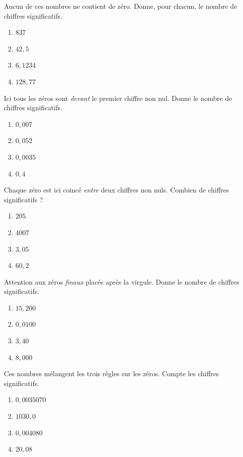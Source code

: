 \documentclass[11pt,a4paper]{article}
\begin{document}
\begin{exo}
Aucun de ces nombres ne contient de zéro. Donne, pour chacun, le nombre de chiffres significatifs.
\begin{enumerate}[label=\alph*)]
  \item $837$
  \item $42,5$
  \item $6,1234$
  \item $128,77$
\end{enumerate}
\end{exo}

\begin{exo}
Ici tous les zéros sont \emph{devant} le premier chiffre non nul. Donne le nombre de chiffres
significatifs.
\begin{enumerate}[label=\alph*)]
  \item $0,007$
  \item $0,052$
  \item $0,0035$
  \item $0,4$
\end{enumerate}
\end{exo}

\begin{exo}
Chaque zéro est ici coincé \emph{entre} deux chiffres non nuls. Combien de chiffres significatifs ?
\begin{enumerate}[label=\alph*)]
  \item $205$
  \item $4007$
  \item $3,05$
  \item $60,2$
\end{enumerate}
\end{exo}

\begin{exo}
Attention aux zéros \emph{finaux} placés après la virgule. Donne le nombre de chiffres significatifs.
\begin{enumerate}[label=\alph*)]
  \item $15,200$
  \item $0,0100$
  \item $3,40$
  \item $8,000$
\end{enumerate}
\end{exo}

\begin{exo}
Ces nombres mélangent les trois règles sur les zéros. Compte les chiffres significatifs.
\begin{enumerate}[label=\alph*)]
  \item $0,0035070$
  \item $1030,0$
  \item $0,004080$
  \item $20,08$
\end{enumerate}
\end{exo}
\end{document}
